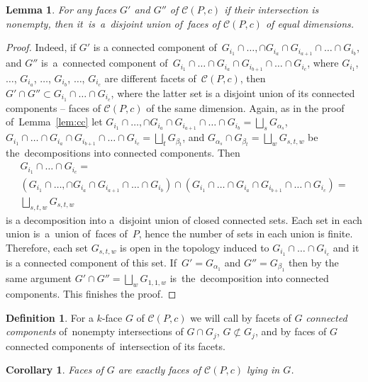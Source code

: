 \documentclass[12pt]{amsart}
\newtheorem{corollary}[formula]{Corollary}
\newtheorem{lemma}[formula]{Lemma}
\theoremstyle{definition}
\newtheorem{definition}[formula]{Definition}
\theoremstyle{remark}
\begin{document}
\begin{lemma}\label{lem:intG}
For any faces $G'$ and $G''$ of $\mathcal{C}(P,c)$ if their intersection is nonempty, then it~is~a~disjoint union 
of~faces of $\mathcal{C}(P,c)$ of equal dimensions.
\end{lemma}
\begin{proof}
Indeed, if $G'$ is a connected component of~$G_{i_1}\cap\dots,\cap G_{i_a}\cap G_{i_{a+1}}\cap \dots\cap G_{i_b}$, 
and $G''$ is~a~connected component of~$G_{i_1}\cap\dots\cap G_{i_a}\cap G_{i_{b+1}}\cap \dots\cap G_{i_c}$,
where $G_{i_1}$, $\dots$, $G_{i_a}$, $\dots$, $G_{i_b}$, $\dots$, $G_{i_c}$ are different facets of~$\mathcal{C}(P,c)$,
then $G'\cap G''\subset G_{i_1}\cap \dots\cap G_{i_c}$, where the latter set is a disjoint union of its connected components --
faces of $\mathcal{C}(P,c)$ of the same dimension. Again, as in the proof of~Lemma~\ref{lem:cc} let
$G_{i_1}\cap\dots,\cap G_{i_a}\cap G_{i_{a+1}}\cap \dots\cap G_{i_b}=\bigsqcup\limits_{s} G_{\alpha_s}$,
$G_{i_1}\cap\dots\cap G_{i_a}\cap G_{i_{b+1}}\cap \dots\cap G_{i_c}=\bigsqcup\limits_{t} G_{\beta_t}$, and 
$G_{\alpha_s}\cap G_{\beta_t}=\bigsqcup\limits_{w}G_{s,t,w}$ be 
the~decompositions into connected components. Then
\begin{gather*}
G_{i_1}\cap \dots\cap G_{i_c}=\\
\left(G_{i_1}\cap\dots,\cap G_{i_a}\cap G_{i_{a+1}}\cap \dots\cap G_{i_b}\right)\cap
\left(G_{i_1}\cap\dots\cap G_{i_a}\cap G_{i_{b+1}}\cap \dots\cap G_{i_c}\right)=\\
\bigsqcup\limits_{s,t,w}G_{s,t,w}
\end{gather*}
is a decomposition into a~disjoint union of closed connected sets. 
Each set in each union is~a~union of~faces of~$P$, hence
the number of sets in each union is finite. Therefore, each set   $G_{s,t,w}$ is open in the 
topology induced to $G_{i_1}\cap \dots\cap G_{i_c}$
and it is a connected component of this set.
If~$G'=G_{\alpha_1}$ and $G''=G_{\beta_1}$ then by the same argument 
$G'\cap G''=\bigsqcup\limits_{w}G_{1,1,w}$ is~the~decomposition
into connected components. This finishes the proof. 

\end{proof}
\begin{definition}
For a $k$-face $G$ of $\mathcal{C}(P,c)$ we will call by facets of $G$ {\it connected components} of~nonempty 
intersections of $G\cap G_j$, $G\not\subset G_j$, and by faces of $G$ connected components of~intersection of its facets. 
\end{definition}
\begin{corollary}\label{cor:fG}
Faces of $G$ are exactly faces of $\mathcal{C}(P,c)$ lying in $G$.
\end{corollary}
\end{document}
